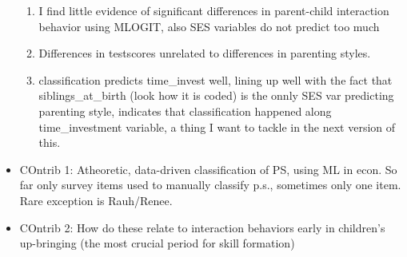\begin{itemize}
\begin{enumerate}
		\item  I find little evidence of significant differences in parent-child interaction behavior using MLOGIT, also SES variables do not predict too much
		\item Differences in testscores unrelated to differences in parenting styles. 
		\item classification predicts time_invest well, lining up well with the fact that siblings_at_birth (look how it is coded) is the onnly SES var predicting parenting style, indicates  that classification happened along time_investment variable, a thing I want to tackle in the next version of this.
	\end{enumerate} 
	\item COntrib 1: Atheoretic, data-driven classification of PS, using ML in econ. So far only survey items used to manually classify p.s., sometimes only one item. Rare exception is Rauh/Renee.
	\item COntrib 2: How do these relate to interaction behaviors early in children’s up-bringing (the most crucial period for skill formation)
\end{itemize}